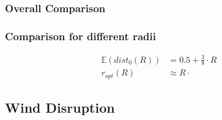 \newpage

\subsubsection{Overall Comparison}

\newpage

\subsubsection{Comparison for different radii}
\begin{align}
	\mathbb{E} (dist_0(R)) &= 0.5 + \frac{3}{8} \cdot R \\
	r_{opt}(R) &\approx R \cdot  
\end{align}

\newpage

\subsection{Wind Disruption}


